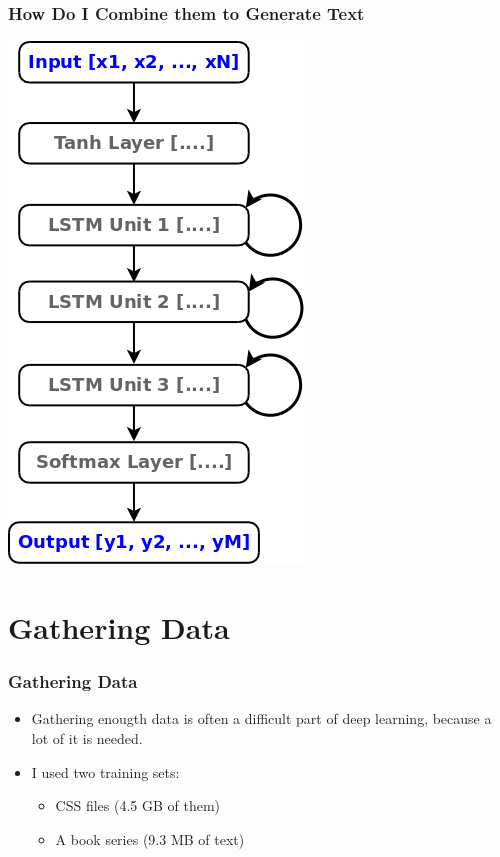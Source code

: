 \documentclass[12]{beamer}
\begin{document}
\begin{frame}
\frametitle{How Do I Combine them to Generate Text}
\begin{center}
\includegraphics[scale=0.25]{../images/network03.png}
\end{center}
\end{frame}

\section{Gathering Data}
\begin{frame}
\frametitle{Gathering Data}
\begin{itemize}
\item<1-> Gathering enougth data is often a difficult part of deep learning, because a lot of it is needed.
\item<1-> I used two training sets:
\begin{itemize}
\item<1-> CSS files (4.5 GB of them)
\item<1-> A book series (9.3 MB of text)
\end{itemize}
\end{itemize}
\end{frame}
\end{document}
